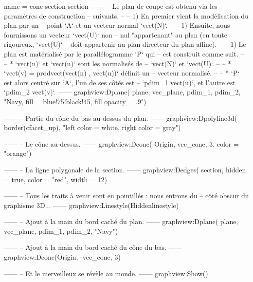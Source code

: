 \documentclass[border = 3pt]{standalone}
\begin{document}
\begin{luadraw}{name = cone-section-section}
------
-- Le plan de coupe est obtenu via les paramètres de construction
-- suivants.
--
--     1) En premier vient la modélisation du plan par un
--     point `A` et un vecteur normal `vect(N)`.
--
--     1) Ensuite, nous fournissons un vecteur `vect(U)` non
--     nul "appartenant" au plan (en toute rigoureux, `vect(U)`
--     doit appartenir au plan directeur du plan affine).
--
--     1) Le plan est matérialisé par le parallélogramme `P` qui
--     est construit comme suit.
--
--         * `vect(n)` et `vect(u)` sont les normalisés de
--         `vect(N)` et `vect(U)`.
--
--         * `vect(v) = prodvect(vect(n) , vect(u))` définit un
--         vecteur normalisé.
--
--         * `P` est alors centré sur `A`, l'un de ses côtés est
--         `pdim_1 vect(u)`, et l'autre est `pdim_2 vect(v)`.
------
    graphview:Dplane(
        plane,
        vec_plane, pdim_1, pdim_2,
        "Navy, fill = blue!75!black!45, fill opacity = .9")

------
-- Partie du cône du bas au-dessus du plan.
------
    graphview:Dpolyline3d(
        border(cfacet_up),
        "left color = white, right color = gray")

------
-- Le cône au-dessus.
------
    graphview:Dcone(
        Origin, vec_cone, 3,
        {color = "orange"})

------
-- La ligne polygonale de la section.
------
    graphview:Dedges(
        section,
        {hidden = true, color = "red", width = 12})

------
-- Tous les traits à venir sont en pointillés : nous entrons du
-- côté obscur du graphisme 3D...
------
    graphview:Linestyle(Hiddenlinestyle)

------
-- Ajout à la main du bord caché du plan.
------
    graphview:Dplane(
        plane,
        vec_plane, pdim_1, pdim_2,
        "Navy")

------
-- Ajout à la main du bord caché du cône du bas.
------
    graphview:Dcone(Origin, -vec_cone, 3)

------
-- Et le merveilleux se révèle au monde.
------
    graphview:Show()
\end{luadraw}
\end{document}
